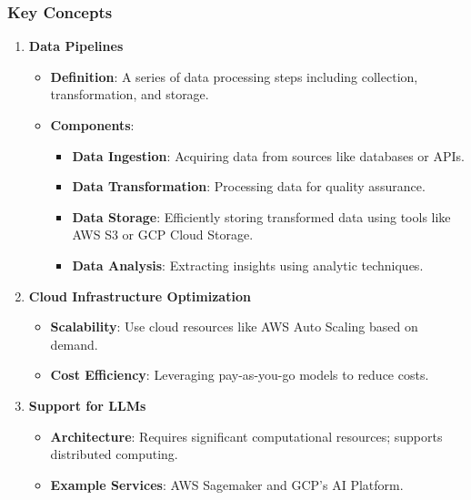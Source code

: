 \documentclass[aspectratio=169]{beamer}
\begin{document}
\begin{frame}[fragile]
    \frametitle{Key Concepts}
    \begin{enumerate}
        \item \textbf{Data Pipelines}
            \begin{itemize}
                \item \textbf{Definition}: A series of data processing steps including collection, transformation, and storage.
                \item \textbf{Components}:
                    \begin{itemize}
                        \item \textbf{Data Ingestion}: Acquiring data from sources like databases or APIs.
                        \item \textbf{Data Transformation}: Processing data for quality assurance.
                        \item \textbf{Data Storage}: Efficiently storing transformed data using tools like AWS S3 or GCP Cloud Storage.
                        \item \textbf{Data Analysis}: Extracting insights using analytic techniques.
                    \end{itemize}
            \end{itemize}
        
        \item \textbf{Cloud Infrastructure Optimization}
            \begin{itemize}
                \item \textbf{Scalability}: Use cloud resources like AWS Auto Scaling based on demand.
                \item \textbf{Cost Efficiency}: Leveraging pay-as-you-go models to reduce costs.
            \end{itemize}
        
        \item \textbf{Support for LLMs}
            \begin{itemize}
                \item \textbf{Architecture}: Requires significant computational resources; supports distributed computing.
                \item \textbf{Example Services}: AWS Sagemaker and GCP's AI Platform.
            \end{itemize}
    \end{enumerate}
\end{frame}
\end{document}
